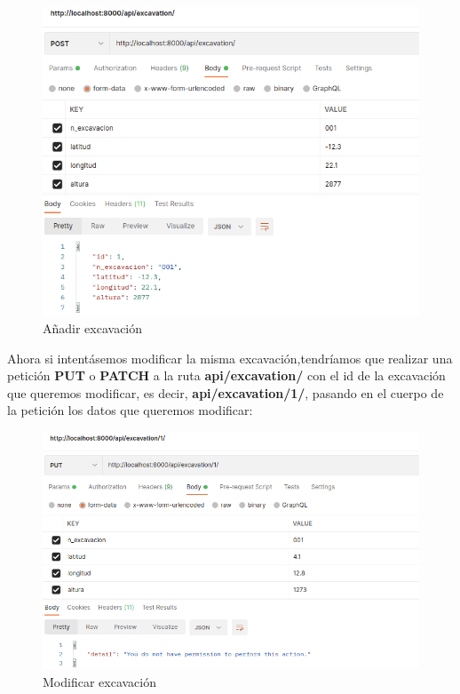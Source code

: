         \begin{figure}[H]
            \centering
            \includegraphics[scale=0.40]{imagenes/post-excavation.png}
            \caption{Añadir excavación}
            \label{fig:post-excavation}
        \end{figure}

Ahora si intentásemos modificar la misma excavación,tendríamos que realizar una petición
\textbf{PUT} o \textbf{PATCH} a la ruta \textbf{api/excavation/} con el id de la excavación
que queremos modificar, es decir, \textbf{api/excavation/1/}, pasando en el cuerpo de la
petición los datos que queremos modificar:

        \begin{figure}[H]
            \centering
            \includegraphics[scale=0.40]{imagenes/put-excavation.png}
            \caption{Modificar excavación}
            \label{fig:put-excavation}
        \end{figure}

